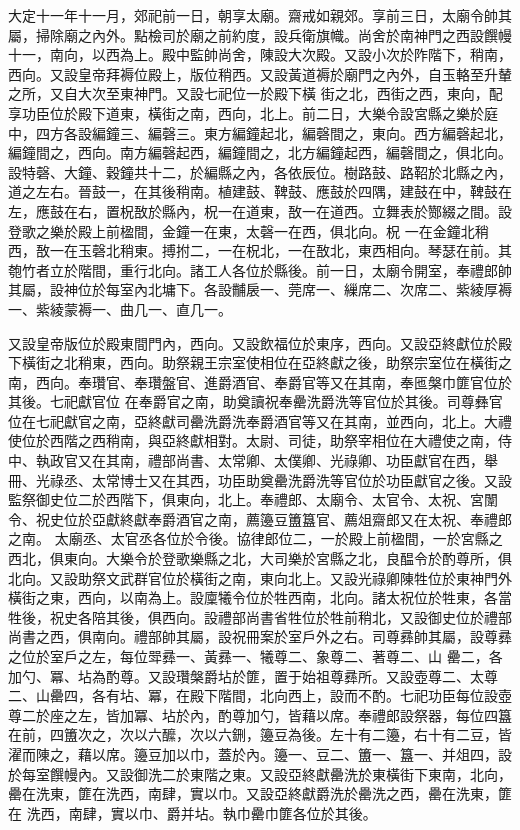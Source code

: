 \begin{pinyinscope}
 大定十一年十一月，郊祀前一日，朝享太廟。齋戒如親郊。享前三日，太廟令帥其屬，掃除廟之內外。點檢司於廟之前約度，設兵衛旗幟。尚舍於南神門之西設饌幔十一，南向，以西為上。殿中監帥尚舍，陳設大次殿。又設小次於阼階下，稍南，西向。又設皇帝拜褥位殿上，版位稍西。又設黃道褥於廟門之內外，自玉輅至升輦之所，又自大次至東神門。又設七祀位一於殿下橫
 街之北，西街之西，東向，配享功臣位於殿下道東，橫街之南，西向，北上。前二日，大樂令設宮縣之樂於庭中，四方各設編鐘三、編磬三。東方編鐘起北，編磬間之，東向。西方編磬起北，編鐘間之，西向。南方編磬起西，編鐘間之，北方編鐘起西，編磬間之，俱北向。設特磬、大鐘、穀鐘共十二，於編縣之內，各依辰位。樹路鼓、路鞀於北縣之內，道之左右。晉鼓一，在其後稍南。植建鼓、鞞鼓、應鼓於四隅，建鼓在中，鞞鼓在左，應鼓在右，置柷敔於縣內，柷一在道東，敔一在道西。立舞表於酂綴之間。設登歌之樂於殿上前楹間，金鐘一在東，太磬一在西，俱北向。柷
 一在金鐘北稍西，敔一在玉磬北稍東。搏拊二，一在柷北，一在敔北，東西相向。琴瑟在前。其匏竹者立於階間，重行北向。諸工人各位於縣後。前一日，太廟令開室，奉禮郎帥其屬，設神位於每室內北墉下。各設黼扆一、莞席一、繅席二、次席二、紫綾厚褥一、紫綾蒙褥一、曲几一、直几一。



 又設皇帝版位於殿東間門內，西向。又設飲福位於東序，西向。又設亞終獻位於殿下橫街之北稍東，西向。助祭親王宗室使相位在亞終獻之後，助祭宗室位在橫街之南，西向。奉瓚官、奉瓚盤官、進爵酒官、奉爵官等又在其南，奉匜槃巾篚官位於其後。七祀獻官位
 在奉爵官之南，助奠讀祝奉罍洗爵洗等官位於其後。司尊彝官位在七祀獻官之南，亞終獻司罍洗爵洗奉爵酒官等又在其南，並西向，北上。大禮使位於西階之西稍南，與亞終獻相對。太尉、司徒，助祭宰相位在大禮使之南，侍中、執政官又在其南，禮部尚書、太常卿、太僕卿、光祿卿、功臣獻官在西，舉冊、光祿丞、太常博士又在其西，功臣助奠罍洗爵洗等官位於功臣獻官之後。又設監祭御史位二於西階下，俱東向，北上。奉禮郎、太廟令、太官令、太祝、宮闈令、祝史位於亞獻終獻奉爵酒官之南，薦籩豆簠簋官、薦俎齋郎又在太祝、奉禮郎之南。
 太廟丞、太官丞各位於令後。協律郎位二，一於殿上前楹間，一於宮縣之西北，俱東向。大樂令於登歌樂縣之北，大司樂於宮縣之北，良醖令於酌尊所，俱北向。又設助祭文武群官位於橫街之南，東向北上。又設光祿卿陳牲位於東神門外橫街之東，西向，以南為上。設廩犧令位於牲西南，北向。諸太祝位於牲東，各當牲後，祝史各陪其後，俱西向。設禮部尚書省牲位於牲前稍北，又設御史位於禮部尚書之西，俱南向。禮部帥其屬，設祝冊案於室戶外之右。司尊彞帥其屬，設尊彞之位於室戶之左，每位斝彞一、黃彞一、犧尊二、象尊二、著尊二、山
 罍二，各加勺、冪、坫為酌尊。又設瓚槃爵坫於篚，置于始祖尊彞所。又設壺尊二、太尊二、山罍四，各有坫、冪，在殿下階間，北向西上，設而不酌。七祀功臣每位設壺尊二於座之左，皆加冪、坫於內，酌尊加勺，皆藉以席。奉禮郎設祭器，每位四簋在前，四簠次之，次以六醿，次以六鉶，籩豆為後。左十有二籩，右十有二豆，皆濯而陳之，藉以席。籩豆加以巾，蓋於內。籩一、豆二、簠一、簋一、并俎四，設於每室饌幔內。又設御洗二於東階之東。又設亞終獻罍洗於東橫街下東南，北向，罍在洗東，篚在洗西，南肆，實以巾。又設亞終獻爵洗於罍洗之西，罍在洗東，篚在
 洗西，南肆，實以巾、爵并坫。執巾罍巾篚各位於其後。




\end{pinyinscope}
